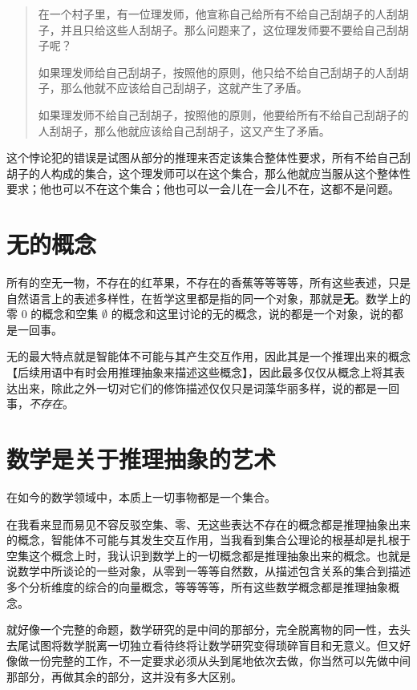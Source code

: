 \documentclass[12pt,oneside]{book}
\begin{document}
\begin{quote}
在一个村子里，有一位理发师，他宣称自己给所有不给自己刮胡子的人刮胡子，并且只给这些人刮胡子。那么问题来了，这位理发师要不要给自己刮胡子呢？

如果理发师给自己刮胡子，按照他的原则，他只给不给自己刮胡子的人刮胡子，那么他就不应该给自己刮胡子，这就产生了矛盾。

如果理发师不给自己刮胡子，按照他的原则，他要给所有不给自己刮胡子的人刮胡子，那么他就应该给自己刮胡子，这又产生了矛盾。
\end{quote}

这个悖论犯的错误是试图从部分的推理来否定该集合整体性要求，所有不给自己刮胡子的人构成的集合，这个理发师可以在这个集合，那么他就应当服从这个整体性要求；他也可以不在这个集合；他也可以一会儿在一会儿不在，这都不是问题。

\section{无的概念}
所有的空无一物，不存在的红苹果，不存在的香蕉等等等等，所有这些表述，只是自然语言上的表述多样性，在哲学这里都是指的同一个对象，那就是\textbf{无}。数学上的零 $0$ 的概念和空集 $\emptyset$ 的概念和这里讨论的无的概念，说的都是一个对象，说的都是一回事。

无的最大特点就是智能体不可能与其产生交互作用，因此其是一个推理出来的概念【后续用语中有时会用推理抽象来描述这些概念】，因此最多仅仅从概念上将其表达出来，除此之外一切对它们的修饰描述仅仅只是词藻华丽多样，说的都是一回事，\textit{不存在}。

\section{数学是关于推理抽象的艺术}
\begin{bookref}[frametitle={\cite{Elements of Set Theory}}]
在如今的数学领域中，本质上一切事物都是一个集合。
\end{bookref}

在我看来显而易见不容反驳空集、零、无这些表达不存在的概念都是推理抽象出来的概念，智能体不可能与其发生交互作用，当我看到集合公理论的根基却是扎根于空集这个概念上时，我认识到数学上的一切概念都是推理抽象出来的概念。也就是说数学中所谈论的一些对象，从零到一等等自然数，从描述包含关系的集合到描述多个分析维度的综合的向量概念，等等等等，所有这些数学概念都是推理抽象概念。

就好像一个完整的命题，数学研究的是中间的那部分，完全脱离物的同一性，去头去尾试图将数学脱离一切独立看待终将让数学研究变得琐碎盲目和无意义。但又好像做一份完整的工作，不一定要求必须从头到尾地依次去做，你当然可以先做中间那部分，再做其余的部分，这并没有多大区别。
\end{document}
